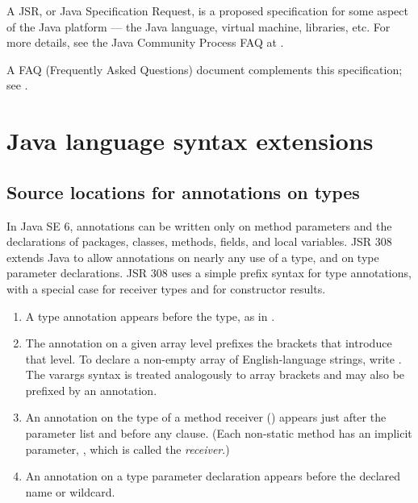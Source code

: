 \documentclass[10pt]{article}
\begin{document}
A JSR, or Java Specification Request, is a proposed specification for some
aspect of the Java platform --- the Java language, virtual machine,
libraries, etc.  For more details, see the Java Community Process FAQ at
.


A FAQ (Frequently Asked Questions) document complements this specification;
see .



\section{Java language syntax extensions\label{syntax}}



\subsection{Source locations for annotations on types\label{type-annotation-locations}}

In Java SE 6, annotations can be written only on method parameters
and the declarations of packages, classes, methods, fields, and local variables.
JSR 308 extends Java to allow annotations on nearly any use of a type, and
on type parameter declarations.
JSR 308 uses a simple prefix syntax for type annotations, with a special case
for receiver types and for constructor results.

\begin{enumerate}
\item
  A type annotation appears before the type, as in .
\item
  The annotation on a given array level
  prefixes the brackets that introduce that level.  To declare
  a non-empty array of English-language strings, write .
  The varargs syntax  is treated analogously to array brackets
  and may also be prefixed by an annotation.
\item
  An annotation on the type of a method receiver () appears
  just after the parameter list and before any  clause.
  (Each non-static method has an implicit parameter, , which is
  called the \emph{receiver}.)
\item
  An annotation on a type parameter declaration appears before the declared
  name or wildcard.
\end{enumerate}
\end{document}
